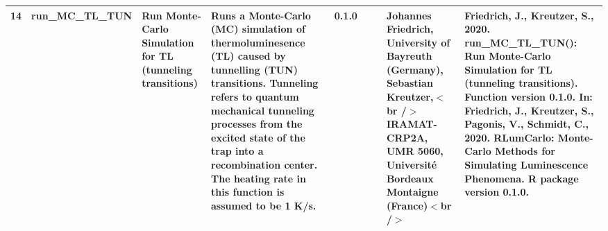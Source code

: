 \begin{table}[ht]
\begin{tabular}{rllllllll}
 \\ 
  14 & run\_MC\_TL\_TUN & Run Monte-Carlo Simulation for TL (tunneling transitions) & Runs a Monte-Carlo (MC) simulation of thermoluminesence (TL) caused by tunnelling (TUN) transitions.  Tunneling refers to quantum mechanical tunneling processes from the excited state of the trap into a recombination center. The heating rate in this function is assumed to be 1 K/s. & 0.1.0
 &  &  & Johannes Friedrich, University of Bayreuth (Germany), Sebastian Kreutzer,$<$br /$>$ IRAMAT-CRP2A, UMR 5060, Université Bordeaux Montaigne (France)$<$br /$>$ & Friedrich, J., Kreutzer, S., 2020. run\_MC\_TL\_TUN(): Run Monte-Carlo Simulation for TL (tunneling transitions). Function version 0.1.0. In: Friedrich, J., Kreutzer, S., Pagonis, V., Schmidt, C., 2020. RLumCarlo: Monte-Carlo Methods for Simulating Luminescence Phenomena. R package version 0.1.0. 
 \\ 
   \hline
\end{tabular}
\end{table}

